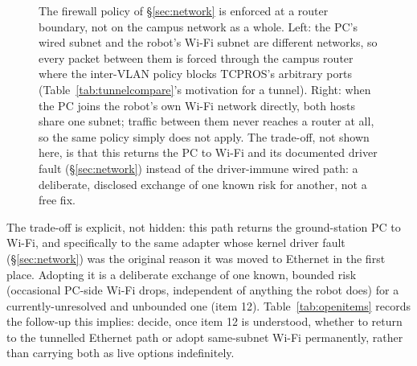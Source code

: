 \begin{figure}[htbp]
{\begin{tikzpicture}
\end{tikzpicture}}
\caption{The firewall policy of \S\ref{sec:network} is enforced at a router
boundary, not on the campus network as a whole. Left: the PC's wired
subnet and the robot's Wi-Fi subnet are different networks, so every packet
between them is forced through the campus router where the inter-VLAN
policy blocks TCPROS's arbitrary ports (Table~\ref{tab:tunnelcompare}'s
motivation for a tunnel). Right: when the PC joins the robot's own Wi-Fi
network directly, both hosts share one subnet; traffic between them never
reaches a router at all, so the same policy simply does not apply. The
trade-off, not shown here, is that this returns the PC to Wi-Fi and its
documented driver fault (\S\ref{sec:network}) instead of the driver-immune
wired path: a deliberate, disclosed exchange of one known risk for
another, not a free fix.}
\label{fig:subnet-boundary}
\end{figure}

The trade-off is explicit, not hidden: this path returns the ground-station
PC to Wi-Fi, and specifically to the same  adapter whose
kernel driver fault (\S\ref{sec:network}) was the original reason it was
moved to Ethernet in the first place. Adopting it is a deliberate exchange
of one known, bounded risk (occasional PC-side Wi-Fi drops, independent of
anything the robot does) for a currently-unresolved and unbounded one
(item 12). Table~\ref{tab:openitems} records the follow-up this implies:
decide, once item 12 is understood, whether to return to the tunnelled
Ethernet path or adopt same-subnet Wi-Fi permanently, rather than carrying
both as live options indefinitely.

